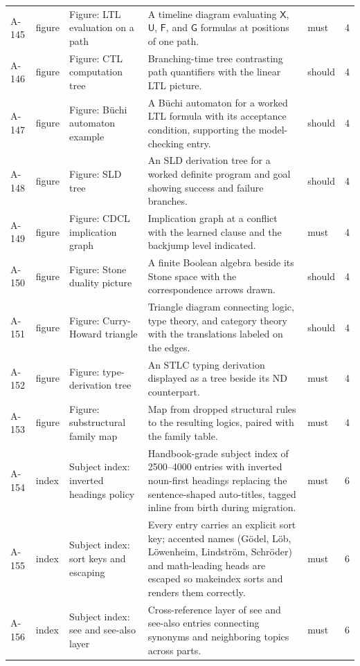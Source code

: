\begin{longtable}{@{}p{0.45in}p{0.78in}p{2.02in}p{2.6in}p{0.42in}p{0.16in}@{}}
A-145 & figure & Figure: LTL evaluation on a path & A timeline diagram evaluating \(\mathsf X\), \(\mathsf U\), \(\mathsf F\), and \(\mathsf G\) formulas at positions of one path. & must & 4 \\
A-146 & figure & Figure: CTL computation tree & Branching-time tree contrasting path quantifiers with the linear LTL picture. & should & 4 \\
A-147 & figure & Figure: B\"uchi automaton example & A B\"uchi automaton for a worked LTL formula with its acceptance condition, supporting the model-checking entry. & should & 4 \\
A-148 & figure & Figure: SLD tree & An SLD derivation tree for a worked definite program and goal showing success and failure branches. & should & 4 \\
A-149 & figure & Figure: CDCL implication graph & Implication graph at a conflict with the learned clause and the backjump level indicated. & must & 4 \\
A-150 & figure & Figure: Stone duality picture & A finite Boolean algebra beside its Stone space with the correspondence arrows drawn. & should & 4 \\
A-151 & figure & Figure: Curry-Howard triangle & Triangle diagram connecting logic, type theory, and category theory with the translations labeled on the edges. & should & 4 \\
A-152 & figure & Figure: type-derivation tree & An STLC typing derivation displayed as a tree beside its ND counterpart. & must & 4 \\
A-153 & figure & Figure: substructural family map & Map from dropped structural rules to the resulting logics, paired with the family table. & must & 4 \\
A-154 & index & Subject index: inverted headings policy & Handbook-grade subject index of 2500--4000 entries with inverted noun-first headings replacing the sentence-shaped auto-titles, tagged inline from birth during migration. & must & 6 \\
A-155 & index & Subject index: sort keys and escaping & Every entry carries an explicit sort key; accented names (G\"odel, L\"ob, L\"owenheim, Lindstr\"om, Schr\"oder) and math-leading heads are escaped so makeindex sorts and renders them correctly. & must & 6 \\
A-156 & index & Subject index: see and see-also layer & Cross-reference layer of see and see-also entries connecting synonyms and neighboring topics across parts. & must & 6 \\

\end{longtable}
